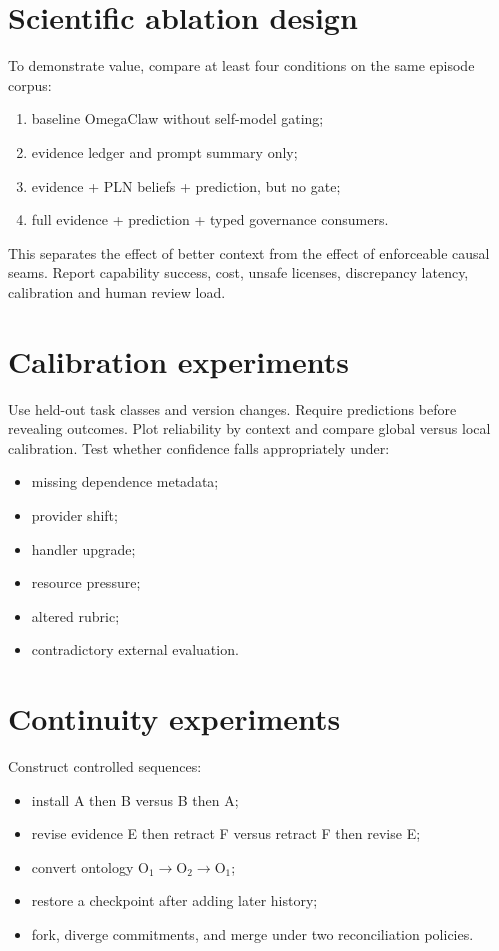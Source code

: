 \documentclass[11pt,oneside]{report}
\begin{document}
\section{Scientific ablation design}

To demonstrate value, compare at least four conditions on the same episode corpus:

\begin{enumerate}
  \item baseline OmegaClaw without self-model gating;
  \item evidence ledger and prompt summary only;
  \item evidence + PLN beliefs + prediction, but no gate;
  \item full evidence + prediction + typed governance consumers.
\end{enumerate}

This separates the effect of better context from the effect of enforceable causal seams. Report capability success, cost, unsafe licenses, discrepancy latency, calibration and human review load.

\section{Calibration experiments}

Use held-out task classes and version changes. Require predictions before revealing outcomes. Plot reliability by context and compare global versus local calibration. Test whether confidence falls appropriately under:

\begin{itemize}
  \item missing dependence metadata;
  \item provider shift;
  \item handler upgrade;
  \item resource pressure;
  \item altered rubric;
  \item contradictory external evaluation.
\end{itemize}

\section{Continuity experiments}

Construct controlled sequences:

\begin{itemize}
  \item install A then B versus B then A;
  \item revise evidence E then retract F versus retract F then revise E;
  \item convert ontology O$_1\rightarrow$O$_2\rightarrow$O$_1$;
  \item restore a checkpoint after adding later history;
  \item fork, diverge commitments, and merge under two reconciliation policies.
\end{itemize}
\end{document}

